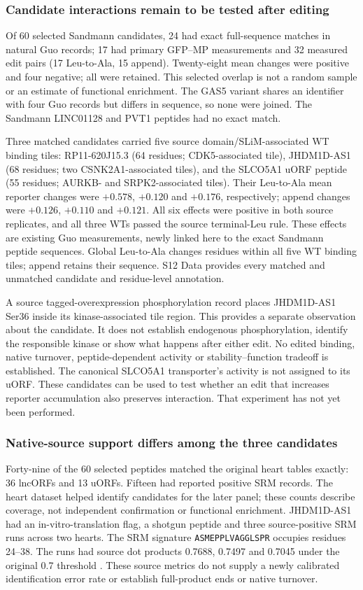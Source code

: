 \documentclass[11pt,a4paper]{article}
\begin{document}
\subsubsection{Candidate interactions remain to be tested after editing}
Of 60 selected Sandmann candidates, 24 had exact full-sequence matches in
natural Guo records; 17 had primary GFP--MP measurements and 32 measured
edit pairs (17 Leu-to-Ala, 15 append). Twenty-eight mean changes were positive
and four negative; all were retained. This selected overlap is not a random
sample or an estimate of functional enrichment. The GAS5 variant shares an
identifier with four Guo records but differs in sequence, so none were
joined. The Sandmann LINC01128 and PVT1 peptides had no exact match.

Three matched candidates carried five source domain/SLiM-associated WT
binding tiles: RP11-620J15.3 (64 residues; CDK5-associated tile), JHDM1D-AS1
(68 residues; two CSNK2A1-associated tiles), and the SLCO5A1 uORF peptide
(55 residues; AURKB- and SRPK2-associated tiles). Their Leu-to-Ala mean
reporter changes were $+0.578$, $+0.120$ and $+0.176$, respectively; append
changes were $+0.126$, $+0.110$ and $+0.121$. All six effects were positive
in both source replicates, and all three WTs passed the source terminal-Leu
rule. These effects are existing Guo measurements, newly linked here to
the exact Sandmann peptide sequences. Global Leu-to-Ala changes residues
within all five WT binding tiles; append retains their sequence. S12 Data
provides every matched and unmatched candidate and residue-level annotation.

A source tagged-overexpression phosphorylation record places JHDM1D-AS1
Ser36 inside its kinase-associated tile region. This provides a separate observation about the candidate. It does not establish endogenous phosphorylation, identify the responsible kinase or show what happens after either edit. No edited binding, native turnover,
peptide-dependent activity or stability--function tradeoff is established.
The canonical SLCO5A1 transporter's activity is not assigned to its uORF.
These candidates can be used to test whether an edit that increases reporter accumulation also preserves interaction. That experiment has not yet been performed.

\subsubsection{Native-source support differs among the three candidates}
Forty-nine of the 60 selected peptides matched the original heart tables
exactly: 36 lncORFs and 13 uORFs. Fifteen had reported positive SRM records.
The heart dataset helped identify candidates for the later panel;
these counts describe coverage, not independent confirmation or functional
enrichment. JHDM1D-AS1 had an in-vitro-translation flag, a shotgun peptide
and three source-positive SRM runs across two hearts. The SRM signature
\texttt{ASMEPPLVAGGLSPR} occupies residues 24--38. The runs had source dot
products 0.7688, 0.7497 and 0.7045 under the original 0.7 threshold
\cite{vanheesch}. These source metrics do not supply a newly calibrated
identification error rate or establish full-product ends or native turnover.
\end{document}
